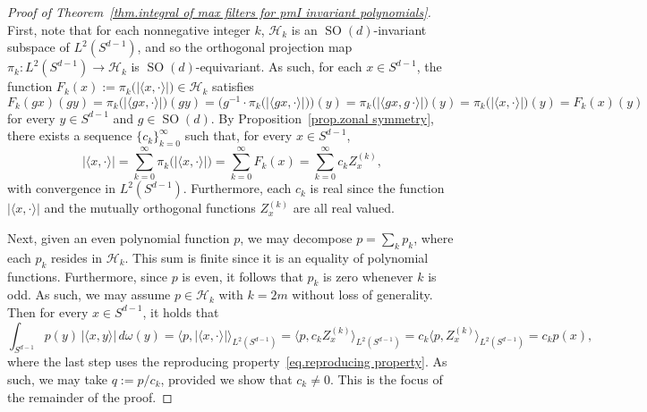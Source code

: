 \documentclass{article}
\theoremstyle{plain}
\theoremstyle{definition}
\begin{document}
\begin{proof}[Proof of Theorem~\ref{thm.integral of max filters for pmI invariant polynomials}]
First, note that for each nonnegative integer $k$, $\mathcal{H}_k$ is an $\operatorname{SO}(d)$-invariant subspace of $L^2(S^{d-1})$, and so the orthogonal projection map $\pi_k\colon L^2(S^{d-1})\to\mathcal{H}_k$ is $\operatorname{SO}(d)$-equivariant.
As such, for each $x\in S^{d-1}$, the function $F_k(x):=\pi_k\big(|\langle x,\cdot\rangle|\big) \in \mathcal{H}_k$ satisfies
\[
F_k(gx)(gy)
=\pi_k\big(|\langle gx,\cdot\rangle|\big)(gy)
=\big(g^{-1}\cdot\pi_k\big(|\langle gx,\cdot\rangle|\big)\big)(y)
=\pi_k\big(|\langle gx,g\,\cdot\rangle|\big)(y)
=\pi_k\big(|\langle x,\cdot\rangle|\big)(y)
=F_k(x)(y)
\]
for every $y\in S^{d-1}$ and $g\in \operatorname{SO}(d)$.
By Proposition~\ref{prop.zonal symmetry}, there exists a sequence $\{c_k\}_{k=0}^\infty$ such that, for every $x \in S^{d-1}$,
\[
|\langle x,\cdot\rangle|
=\sum_{k=0}^\infty\pi_k\big(|\langle x,\cdot\rangle|\big)
=\sum_{k=0}^\infty F_k(x)
=\sum_{k=0}^\infty c_kZ_x^{(k)},
\]
with convergence in $L^2(S^{d-1})$.
Furthermore, each $c_k$ is real since the function $|\langle x,\cdot\rangle|$ and the mutually orthogonal functions $Z_x^{(k)}$ are all real valued.

Next, given an even polynomial function $p$, we may decompose $p=\sum_k p_k$, where each $p_k$ resides in $\mathcal{H}_k$.
This sum is finite since it is an equality of polynomial functions.
Furthermore, since $p$ is even, it follows that $p_k$ is zero whenever $k$ is odd.
As such, we may assume $p\in\mathcal{H}_{k}$ with $k=2m$ without loss of generality.
Then for every $x \in S^{d-1}$, it holds that
\[
\int_{S^{d-1}} p(y)\,|\langle x,y\rangle|\,d\omega(y)
=\big\langle p,|\langle x,\cdot\rangle|\big\rangle_{L^2(S^{d-1})}
=\langle p,c_kZ_x^{(k)}\rangle_{L^2(S^{d-1})}
=c_k\langle p,Z_x^{(k)}\rangle_{L^2(S^{d-1})}
=c_kp(x),
\]
where the last step uses the reproducing property~\eqref{eq.reproducing property}.
As such, we may take $q:=p/c_k$, provided we show that $c_k\neq0$.
This is the focus of the remainder of the proof.


\end{proof}
\end{document}
